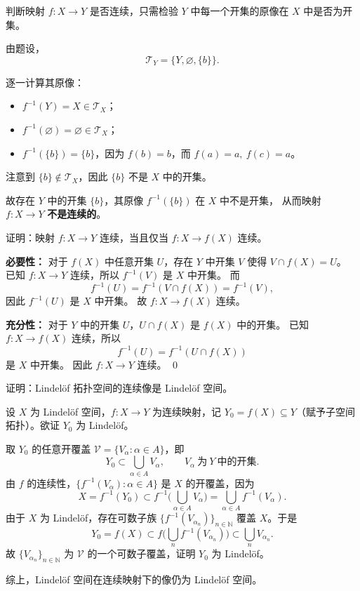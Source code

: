 \begin{solution}
判断映射 $f:X\to Y$ 是否连续，只需检验 $Y$ 中每一个开集的原像在 $X$ 中是否为开集。

由题设，
\[
\mathcal{T}_Y=\{Y,\varnothing,\{b\}\}.
\]

逐一计算其原像：

\begin{itemize}
  \item $f^{-1}(Y)=X\in\mathcal{T}_X$；
  \item $f^{-1}(\varnothing)=\varnothing\in\mathcal{T}_X$；
  \item $f^{-1}(\{b\})=\{b\}$，因为 $f(b)=b$，而 $f(a)=a,\ f(c)=a$。
\end{itemize}

注意到 $\{b\}\notin\mathcal{T}_X$，因此 $\{b\}$ 不是 $X$ 中的开集。

故存在 $Y$ 中的开集 $\{b\}$，其原像 $f^{-1}(\{b\})$ 在 $X$ 中不是开集，
从而映射 $f:X\to Y$ \textbf{不是连续的}。
\end{solution}
\begin{homework}[12]
证明：映射 $f:X\to Y$ 连续，当且仅当 $f:X\to f(X)$ 连续。
\end{homework}
 \begin{solution}
\textbf{必要性：}  
对于 $f(X)$ 中任意开集 $U$，存在 $Y$ 中开集 $V$ 使得 $V\cap f(X)=U$。  
已知 $f:X\to Y$ 连续，所以 $f^{-1}(V)$ 是 $X$ 中开集。  
而
\[
f^{-1}(U)=f^{-1}(V\cap f(X))=f^{-1}(V),
\]
因此 $f^{-1}(U)$ 是 $X$ 中开集。  
故 $f:X\to f(X)$ 连续。

\textbf{充分性：}  
对于 $Y$ 中的开集 $U$，$U\cap f(X)$ 是 $f(X)$ 中的开集。  
已知 $f:X\to f(X)$ 连续，所以
\[
f^{-1}(U)=f^{-1}(U\cap f(X))
\]
是 $X$ 中开集。  
因此 $f:X\to Y$ 连续。 \qed
\end{solution}
\begin{homework}[3]
证明：Lindelöf 拓扑空间的连续像是 Lindelöf 空间。
\end{homework}
\begin{solution}
设 $X$ 为 Lindelöf 空间，$f:X\to Y$ 为连续映射，记 $Y_0=f(X)\subseteq Y$（赋予子空间拓扑）。欲证 $Y_0$ 为 Lindelöf。

取 $Y_0$ 的任意开覆盖 $\mathcal{V}=\{V_\alpha:\alpha\in A\}$，即
\[
Y_0\subset \bigcup_{\alpha\in A} V_\alpha ,\qquad V_\alpha\ \text{为}\ Y\ \text{中的开集}.
\]
由 $f$ 的连续性，$\{f^{-1}(V_\alpha):\alpha\in A\}$ 是 $X$ 的开覆盖，因为
\[
X=f^{-1}(Y_0)\subset f^{-1}\!\Big(\bigcup_{\alpha\in A}V_\alpha\Big)
=\bigcup_{\alpha\in A} f^{-1}(V_\alpha).
\]
由于 $X$ 为 Lindelöf，存在可数子族 $\{f^{-1}(V_{\alpha_n})\}_{n\in\mathbb{N}}$ 覆盖 $X$。于是
\[
Y_0=f(X)\subset f\!\Big(\bigcup_{n} f^{-1}(V_{\alpha_n})\Big)
\subset \bigcup_{n} V_{\alpha_n}.
\]
故 $\{V_{\alpha_n}\}_{n\in\mathbb{N}}$ 为 $\mathcal{V}$ 的一个可数子覆盖，证明 $Y_0$ 为 Lindelöf。

综上，Lindelöf 空间在连续映射下的像仍为 Lindelöf 空间。
\end{solution}
